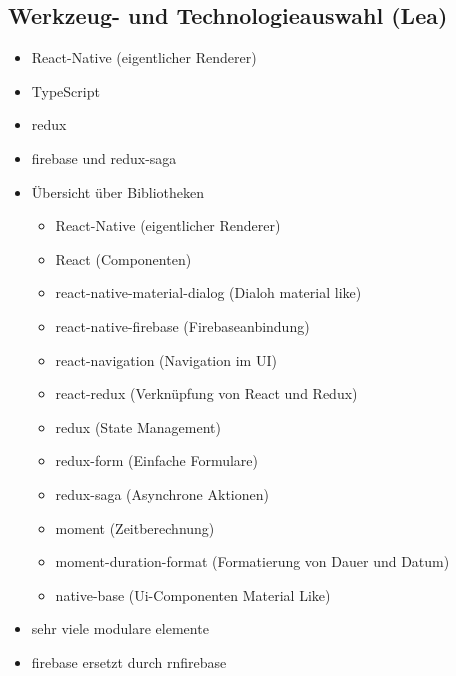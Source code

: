 \subsection{Werkzeug- und Technologieauswahl (Lea)}
\begin{itemize}
    \item React-Native (eigentlicher Renderer)
    \item TypeScript
    \item redux
    \item firebase und redux-saga
\end{itemize}

\begin{itemize}
    \item Übersicht über Bibliotheken
    \begin{itemize}
        \item React-Native (eigentlicher Renderer)
        \item React (Componenten)
        \item react-native-material-dialog (Dialoh material like)
        \item react-native-firebase (Firebaseanbindung)
        \item react-navigation (Navigation im UI)
        \item react-redux (Verknüpfung von React und Redux)
        \item redux (State Management)
        \item redux-form (Einfache Formulare)
        \item redux-saga (Asynchrone Aktionen)
        \item moment (Zeitberechnung)
        \item moment-duration-format (Formatierung von Dauer und Datum)
        \item native-base (Ui-Componenten Material Like)
    \end{itemize}
    \item sehr viele modulare elemente
    \item firebase ersetzt durch rnfirebase
\end{itemize}